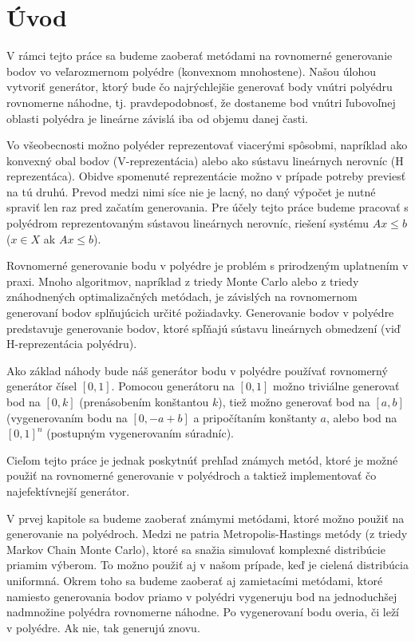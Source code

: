 \chapter*{Úvod} %

V rámci tejto práce sa budeme zaoberať metódami na rovnomerné generovanie bodov vo veľarozmernom polyédre (konvexnom mnohostene). Našou úlohou vytvoriť generátor, ktorý bude čo najrýchlejšie generovať body vnútri polyédru rovnomerne náhodne, tj. pravdepodobnosť, že dostaneme bod vnútri ľubovoľnej oblasti polyédra je lineárne závislá iba od objemu danej časti.

Vo všeobecnosti možno polyéder reprezentovať viacerými spôsobmi, napríklad ako konvexný obal bodov (V-reprezentácia) alebo ako sústavu lineárnych nerovníc (H reprezentáca). Obidve spomenuté reprezentácie možno v prípade potreby previesť na tú druhú. Prevod medzi nimi síce nie je lacný, no daný výpočet je nutné spraviť len raz pred začatím generovania. Pre účely tejto práce budeme pracovať s polyédrom reprezentovaným sústavou lineárnych nerovníc, riešení systému $Ax \leq b$ ($x \in X$ ak $Ax \leq b$).

Rovnomerné generovanie bodu v polyédre je problém s prirodzeným uplatnením v praxi. Mnoho algoritmov, napríklad z triedy Monte Carlo alebo z triedy znáhodnených optimalizačných metódach, je závislých na rovnomernom generovaní bodov splňujúcich určité požiadavky.
Generovanie bodov v polyédre predstavuje generovanie bodov, ktoré spľňajú sústavu lineárnych obmedzení (viď H-reprezentácia polyédru).

Ako základ náhody bude náš generátor bodu v polyédre používať rovnomerný generátor čísel $[0,1]$. Pomocou generátoru na $[0,1]$ možno triviálne generovať bod na $[0,k]$ (prenásobením konštantou $k$), tiež možno generovať bod na $[a,b]$ (vygenerovaním bodu na $[0, -a+b]$ a pripočítaním konštanty $a$, alebo bod na $[0,1]^n$ (postupným vygenerovaním súradníc).

Cieľom tejto práce je jednak poskytnúť prehľad známych metód, ktoré je možné použiť na rovnomerné generovanie v polyédroch a taktiež implementovať čo najefektívnejší generátor.

V prvej kapitole sa budeme zaoberať známymi metódami, ktoré možno použiť na generovanie na polyédroch. Medzi ne patria Metropolis-Hastings metódy (z triedy Markov Chain Monte Carlo), ktoré sa snažia simulovať komplexné distribúcie priamim výberom. To možno použiť aj v našom prípade, keď je cielená distribúcia uniformná.
Okrem toho sa budeme zaoberať aj zamietacími metódami, ktoré namiesto generovania bodov priamo v polyédri vygeneruju bod na jednoduchšej nadmnožine polyédra rovnomerne náhodne. Po vygenerovaní bodu overia, či leží v polyédre. Ak nie, tak generujú znovu.

